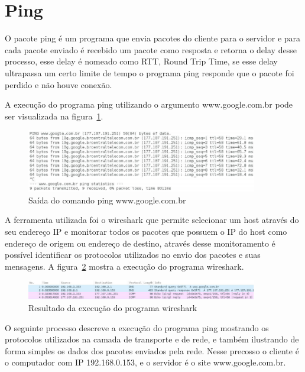 \section{Ping}

O pacote ping é um programa que envia pacotes do cliente para o servidor e para
cada pacote enviado é recebido um pacote como resposta e retorna o delay desse
processo, esse delay é nomeado como RTT, Round Trip Time, se esse delay
ultrapassa um certo limite de tempo o programa ping responde que o pacote foi
perdido e não houve conexão.

A execução do programa ping utilizando o argumento www.google.com.br pode ser
visualizada na figura~\ref{fig:ping_result}.

\begin{figure}[h]
  \centering
  \includegraphics[width=0.9\textwidth]{figuras/ping_result.eps}
  \caption{Saída do comando ping www.google.com.br}
  \label{fig:ping_result}
\end{figure}

A ferramenta utilizada foi o wireshark que permite selecionar um host através
do seu endereço IP e monitorar todos os pacotes que possuem o IP do host como
endereço de origem ou endereço de destino, através desse monitoramento é
possível identificar os protocolos utilizados no envio dos pacotes e suas
mensagens. A figura~\ref{fig:wireshark_result} mostra a execução do programa
wireshark.

\begin{figure}[h]
  \centering
  \includegraphics[width=0.9\textwidth]{figuras/wireshark.eps}
  \caption{Resultado da execução do programa wireshark}
  \label{fig:wireshark_result}
\end{figure}

O seguinte processo descreve a execução do programa ping mostrando os
protocolos utilizados na camada de transporte e de rede, e também
ilustrando de forma simples os dados dos pacotes enviados pela rede.
Nesse precosso o cliente é o computador com IP 192.168.0.153, e o
servidor é o site www.google.com.br.

